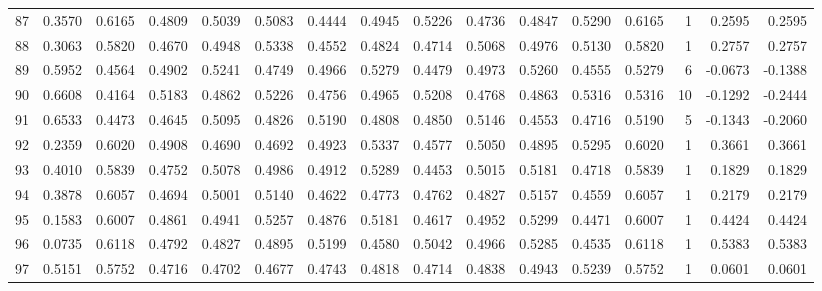 \begin{tabular}{lrrrrrrrrrrrrrrr}
87  &      0.3570 &  0.6165 &  0.4809 &  0.5039 &  0.5083 &  0.4444 &  0.4945 &  0.5226 &  0.4736 &  0.4847 &   0.5290 &     0.6165 &      1 &                    0.2595 &                     0.2595 \\
88  &      0.3063 &  0.5820 &  0.4670 &  0.4948 &  0.5338 &  0.4552 &  0.4824 &  0.4714 &  0.5068 &  0.4976 &   0.5130 &     0.5820 &      1 &                    0.2757 &                     0.2757 \\
89  &      0.5952 &  0.4564 &  0.4902 &  0.5241 &  0.4749 &  0.4966 &  0.5279 &  0.4479 &  0.4973 &  0.5260 &   0.4555 &     0.5279 &      6 &                   -0.0673 &                    -0.1388 \\
90  &      0.6608 &  0.4164 &  0.5183 &  0.4862 &  0.5226 &  0.4756 &  0.4965 &  0.5208 &  0.4768 &  0.4863 &   0.5316 &     0.5316 &     10 &                   -0.1292 &                    -0.2444 \\
91  &      0.6533 &  0.4473 &  0.4645 &  0.5095 &  0.4826 &  0.5190 &  0.4808 &  0.4850 &  0.5146 &  0.4553 &   0.4716 &     0.5190 &      5 &                   -0.1343 &                    -0.2060 \\
92  &      0.2359 &  0.6020 &  0.4908 &  0.4690 &  0.4692 &  0.4923 &  0.5337 &  0.4577 &  0.5050 &  0.4895 &   0.5295 &     0.6020 &      1 &                    0.3661 &                     0.3661 \\
93  &      0.4010 &  0.5839 &  0.4752 &  0.5078 &  0.4986 &  0.4912 &  0.5289 &  0.4453 &  0.5015 &  0.5181 &   0.4718 &     0.5839 &      1 &                    0.1829 &                     0.1829 \\
94  &      0.3878 &  0.6057 &  0.4694 &  0.5001 &  0.5140 &  0.4622 &  0.4773 &  0.4762 &  0.4827 &  0.5157 &   0.4559 &     0.6057 &      1 &                    0.2179 &                     0.2179 \\
95  &      0.1583 &  0.6007 &  0.4861 &  0.4941 &  0.5257 &  0.4876 &  0.5181 &  0.4617 &  0.4952 &  0.5299 &   0.4471 &     0.6007 &      1 &                    0.4424 &                     0.4424 \\
96  &      0.0735 &  0.6118 &  0.4792 &  0.4827 &  0.4895 &  0.5199 &  0.4580 &  0.5042 &  0.4966 &  0.5285 &   0.4535 &     0.6118 &      1 &                    0.5383 &                     0.5383 \\
97  &      0.5151 &  0.5752 &  0.4716 &  0.4702 &  0.4677 &  0.4743 &  0.4818 &  0.4714 &  0.4838 &  0.4943 &   0.5239 &     0.5752 &      1 &                    0.0601 &                     0.0601 \\

\end{tabular}
